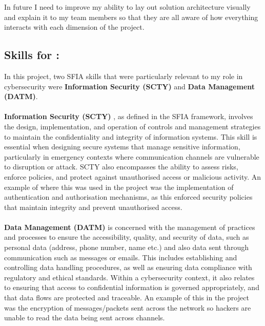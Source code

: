 \documentclass[a4paper, 11pt]{report}
\begin{document}
In future I need to improve my ability to lay out solution architecture visually and explain it to my team members so that they are all aware of how everything interacts with each dimension of the project.\newline

\newpage

\subsection{Skills for \majD: \studD}

In this project, two SFIA skills \cite{sfia} that were particularly relevant to my role in cybersecurity were \textbf{Information Security (SCTY)} and \textbf{Data Management (DATM)}.

\paragraph{}
\textbf{Information Security (SCTY)} \cite{sfiaSCTY}, as defined in the SFIA framework, involves the design, implementation, and operation of controls and management strategies to maintain the confidentiality and integrity of information systems. This skill is essential when designing secure systems that manage sensitive information, particularly in emergency contexts where communication channels are vulnerable to disruption or attack. SCTY also encompasses the ability to assess risks, enforce policies, and protect against unauthorised access or malicious activity. An example of where this was used in the project was the implementation of authentication and authorisation mechanisms, as this enforced security policies that maintain integrity and prevent unauthorised access.

\paragraph{}
\textbf{Data Management (DATM)} \cite{sfiaDATM} is concerned with the management of practices and processes to ensure the accessibility, quality, and security of data, such as personal data (address, phone number, name etc.) and also data sent through communication such as messages or emails. This includes establishing and controlling data handling procedures, as well as ensuring data compliance with regulatory and ethical standards. Within a cybersecurity context, it also relates to ensuring that access to confidential information is governed appropriately, and that data flows are protected and traceable. An example of this in the project was the encryption of messages/packets sent across the network so hackers are unable to read the data being sent across channels.
\end{document}
